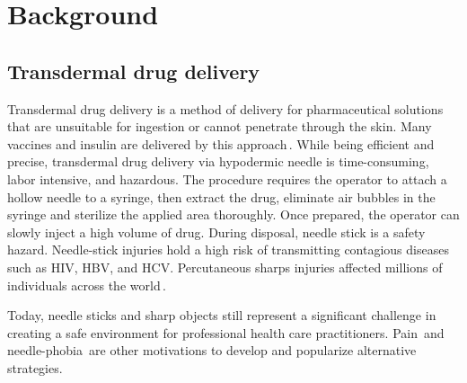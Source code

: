 \chapter{Background}                                \label{Chapter:background}


\section{Transdermal drug delivery}                 \label{Chapter:background/transdermal drug delivery}

    Transdermal drug delivery is a method of delivery for pharmaceutical solutions that are unsuitable for ingestion or cannot penetrate through the skin. Many vaccines and insulin are delivered by this approach\,\cite{sadrzadeh2007}. While being efficient and precise, transdermal drug delivery via hypodermic needle is time-consuming, labor intensive, and hazardous. The procedure requires the operator to attach a hollow needle to a syringe, then extract the drug, eliminate air bubbles in the syringe and sterilize the applied area thoroughly. Once prepared, the operator can slowly inject a high volume of drug. During disposal, needle stick is a safety hazard. Needle-stick injuries hold a high risk of transmitting contagious diseases such as HIV, HBV, and HCV. Percutaneous sharps injuries affected millions of individuals across the world\,\cite{pruss2005}. 
    
    Today, needle sticks and sharp objects still represent a significant challenge in creating a safe environment for professional health care practitioners. Pain\,\cite{schneider1994} and needle-phobia\,\cite{hamilton2005,Nir2003} are other motivations to develop and popularize alternative strategies.
    
